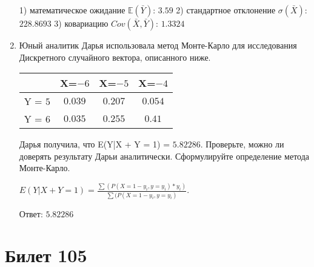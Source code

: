 \documentclass[a4paper,12pt]{article}
\begin{document}
\begin{enumerate}
1) математическое ожидание $\mathbb{E}(\bar Y)$: $3.59$ 
2) стандартное отклонение $\sigma(\bar X)$: $228.8693$
3) ковариацию $Cov(\bar X, \bar Y)$: $1.3324$


\item

    
    	Юный аналитик Дарья использовала метод Монте-Карло для исследования Дискретного случайного вектора, описанного ниже.

        \begin{tabular}{|c|c|c|c|}
	\hline
	& X=$-6$ & X=$-5$ & X=$-4$ \\
	\hline
	Y = $5$ & $0.039$ & $0.207$  &  $0.054$ \\
	\hline
	Y = $6$ & $0.035$ & $0.255$ & $0.41$  \\
	\hline
\end{tabular}

    	Дарья получила, что E(Y|X + Y = 1) = $5.82286$.
    	Проверьте, можно ли доверять результату Дарьи аналитически. Сформулируйте определение метода Монте-Карло.
    


    
        $E(Y|X+Y=1) = \frac{\sum(P(X=1 - y_i, y=y_i) * y_i)}{\sum(P(X=1 - y_i, y=y_i)}$.

        Ответ: $5.82286$
    


\end{enumerate}

\section{Билет 105}
\end{document}
